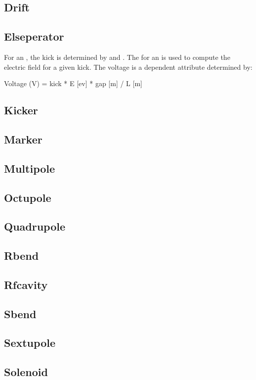 \subsection{Drift}
\subsection{Elseperator}
For an , the kick is determined by  and
. The  for an  is used to compute
the electric field for a given kick. The voltage is a dependent
attribute determined by:
\begin{example}
  Voltage (V) = kick * E [ev] * gap [m] / L [m] 
\end{example}

\subsection{Kicker}
\subsection{Marker}
\subsection{Multipole}
\subsection{Octupole}
\subsection{Quadrupole}
\subsection{Rbend}
\subsection{Rfcavity}
\subsection{Sbend}
\subsection{Sextupole}
\subsection{Solenoid}

